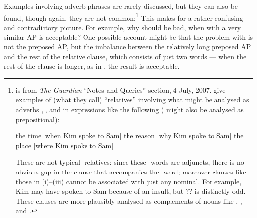 \documentclass[output=paper
 	        ,biblatex
                ,babelshorthands
                ,newtxmath
                ,draftmode
                ,colorlinks, citecolor=brown
]{langscibook}
\begin{document}
Examples involving adverb phrases are rarely discussed, but they can also be found, though
again, they are not common:\footnote{ is from \emph{The Guardian} ``Notes
  and Queries'' section, 4 July, 2007. \citet[1053]{Huddleston02} give examples of (what
  they call) ``relatives'' involving what might be analysed as adverbs ,
  , and  in expressions like the following ( might also be
  analysed as prepositional):
  \begin{exe}
    \ex the time [when Kim spoke to Sam]\label{x:rc-2351}
    \ex the reason [why Kim spoke to Sam]\label{x:rc-2352}
    \ex the place [where Kim spoke to Sam]\label{x:rc-2353}
  \end{exe}
  These are not typical -relatives: since these -words are adjuncts, there
  is no obvious gap in the clause that accompanies the -word; moreover clauses
  like those in (i)--(iii) cannot be associated with just any nominal. For example, Kim
  may have spoken to Sam because of an insult, but ??
  is distinctly odd. These clauses are more plausibly analysed as complements of nouns
  like , , and .}
\label{x:rc-2361} 
\z
This makes for a rather confusing and contradictory picture. For example, why should
 be bad, when  with a very similar AP is acceptable? One
possible account might be that the problem with  is not the preposed
AP, but the imbalance between the relatively long preposed AP and the rest of the relative
clause, which consists of just two words --- when the rest of the clause is longer, as in
, the result is acceptable.
\end{document}
